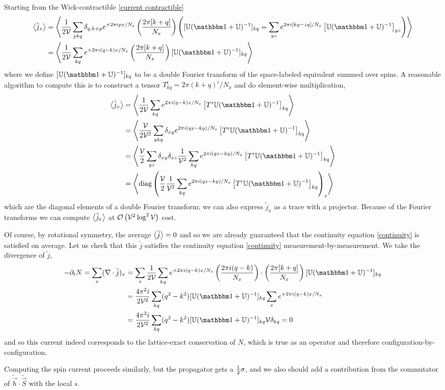 Starting from the Wick-contractible \eqref{current contractible}
\begin{align}
	\expectation{\tilde{j}_x}
	&=
	\expectation{
		\oneover{2\Volume} \sum_{pkq} \delta_{q,k+p} e^{+2\pi i px / N_x} \left(\frac{2\pi [ k+q ]}{N_x}\right)
		\left( [\UU (\one+\UU)\inverse]_{kq} = \sum_{yz} e^{2\pi i [ ky - zq ] / N_x}
		\left[\UU (\one+\UU)\inverse\right]_{yz}
		\right)
	}
	\nonumber\\
	&=
	\expectation{
		\oneover{2\Volume} \sum_{kq} e^{+2\pi i (q-k) x / N_x} \left(\frac{2\pi [ k+q ]}{N_x}\right)
		 [\UU (\one+\UU)\inverse]_{kq}
	}
\end{align}
where we define $[\UU (\one+\UU)\inverse]_{kq}$ to be a double Fourier transform of the space-labeled equivalent summed over spins.
A reasonable algorithm to compute this is to construct a tensor $T_{kq}^i = 2\pi(k+q)^i/N_x$ and do element-wise multiplication,
\begin{align}
	\expectation{\tilde{j}_x}
	&=
	\expectation{
		\frac{1}{2\Volume} \sum_{kq} e^{2\pi i(q-k) x / N_x} \left[ T^i \UU (\one+\UU)\inverse\right]_{kq}
	}
	\nonumber\\
	&=
	\expectation{
		\frac{\Volume}{2\Volume^2} \sum_{ykq} \delta_{xy} e^{2\pi i(qx-ky) / N_x} \left[ T^i \UU (\one+\UU)\inverse\right]_{kq}
	}
	\nonumber\\
	&=
	\expectation{
		\frac{\Volume}{2} \sum_{yz} \delta_{xy} \delta_{xz} \oneover{\Volume^2}\sum_{kq} e^{2\pi i(qz-ky) / N_x} \left[ T^i \UU (\one+\UU)\inverse\right]_{kq}
	}
	\nonumber\\
	&=
	\expectation{
		\diag{
			\frac{\Volume}{2} \oneover{\Volume^2}\sum_{kq} e^{2\pi i(qz-ky) / N_x} \left[ T^i \UU (\one+\UU)\inverse\right]_{kq}
		}_x
	}
\end{align}
which are the diagonal elements of a double Fourier transform; we can also express $\tilde{j}_x$ as a trace with a projector.
Because of the Fourier transforms we can compute $\left\langle \tilde{j}_x \right\rangle$ at $\mathcal{O}\left(\mathcal{V}^2 \log^2 \mathcal{V}\right)$ cost.

Of course, by rotational symmetry, the average $\left\langle \tilde{j} \right\rangle=0$ and so we are already guaranteed that the continuity equation \eqref{continuity} is satisfied on average.
Let us check that this $\tilde{j}$ satisfies the continuity equation \eqref{continuity} measurement-by-measurement.
We take the divergence of $\tilde{j}$,
\begin{align}
	-\partial_t N = \sum_x (\grad\cdot \tilde{j})_x
	&=
	\sum_x \oneover{2\Volume} \sum_{kq} e^{+2\pi i (q-k) x / N_x} \left(\frac{2\pi i(q-k)}{N_x}\right) \cdot \left(\frac{2\pi [ k+q ]}{N_x}\right)
		[\UU (\one+\UU)\inverse]_{kq}
	\nonumber\\
	&=
	\frac{4\pi^2i}{2\Volume^2} \sum_{kq}  (q^2-k^2)
		[\UU (\one+\UU)\inverse]_{kq} \sum_x e^{+2\pi i (q-k) x / N_x}
	\nonumber\\
	&=
	\frac{4\pi^2i}{2\Volume^2} \sum_{kq}  (q^2-k^2)
		[\UU (\one+\UU)\inverse]_{kq} \Volume \delta_{kq} = 0
\end{align}
and so this current indeed corresponds to the lattice-exact conservation of $N$, which is true as an operator and therefore configuration-by-configuration.

Computing the spin current proceeds similarly, but the propagator gets a $\frac{1}{2} \sigma$, and we also should add a contribution from the commutator of $\tilde{\vec{h}}\cdot\tilde{\vec{S}}$ with the local $s$.
